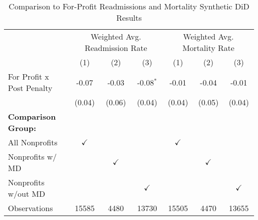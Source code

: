 \begin{table}[ht!]

\caption{\label{tab:forprofit_synth} Comparison to For-Profit Readmissions and Mortality Synthetic DiD Results}
\centering
\begin{tabular}[t]{lcccccc}
\toprule
\multicolumn{1}{c}{ } & \multicolumn{3}{c}{Weighted Avg. Readmission Rate} & \multicolumn{3}{c}{Weighted Avg. Mortality Rate} \\
\cmidrule(l{3pt}r{3pt}){2-4} \cmidrule(l{3pt}r{3pt}){5-7}
 & (1) & (2) & (3) & (1) & (2) & (3)\\
\midrule
For Profit x Post Penalty & -0.07 & -0.03 & -0.08$^{*}$ & -0.01 & -0.04 & -0.01\\
 & (0.04) & (0.06) & (0.04) & (0.04) & (0.05) & (0.04)\\
\textbf{Comparison Group:} &  &  &  &  &  & \\
All Nonprofits & $\checkmark$ &  &  & $\checkmark$ &  & \\
Nonprofits w/ MD &  & $\checkmark$ &  &  & $\checkmark$ & \\
\addlinespace
Nonprofits w/out MD &  &  & $\checkmark$ &  &  & $\checkmark$\\
Observations & 15585 & 4480 & 13730 & 15505 & 4470 & 13655\\
\bottomrule
\end{tabular}
\end{table}
